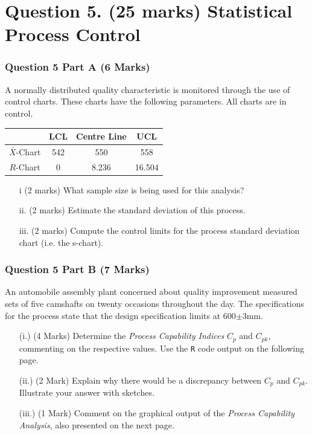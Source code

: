 \documentclass[a4paper,12pt]{article}
\begin{document}
\section*{Question 5. (25 marks) Statistical Process Control }

\subsubsection*{Question 5 Part A (6 Marks)}
A normally distributed quality characteristic is monitored through the use of control charts. These charts have the following parameters. All charts are in control.
\begin{center}
	\begin{tabular}{|c|c|c|c|}
		\hline  & LCL & Centre Line & UCL \\
		\hline $\bar{X}$-Chart & 542 & 550 & 558 \\
		\hline $R$-Chart & 0 & 8.236 & 16.504 \\ \hline
	\end{tabular}
\end{center}

\begin{itemize}
	\item[i] (2 marks) What sample size is being used for this analysis?
	\item[ii.] (2 marks) Estimate the standard deviation of this process.
	\item[iii.] (2 marks) Compute the control limits for the process standard deviation chart (i.e. the s-chart).
\end{itemize}


\subsubsection*{Question 5 Part B (7 Marks)}
An automobile assembly plant concerned about quality improvement measured sets of five camshafts on twenty occasions throughout the day. The specifications for the process state that the design specification limits at 600$\pm$3mm.


\begin{itemize}
	\item[(i.)] (4 Marks) Determine the \emph{Process Capability Indices} $C_p$ and $C_{pk}$, commenting on the respective values. Use the \texttt{R} code output on the following page.
	\item[(ii.)] (2 Mark)  Explain why there would be a discrepancy between $C_p$ and $C_{pk}$. Illustrate your answer with sketches.
	\item[(iii.)] (1 Mark) Comment on the graphical output of the \emph{Process Capability Analysis}, also presented on the next page.
\end{itemize}
\end{document}

